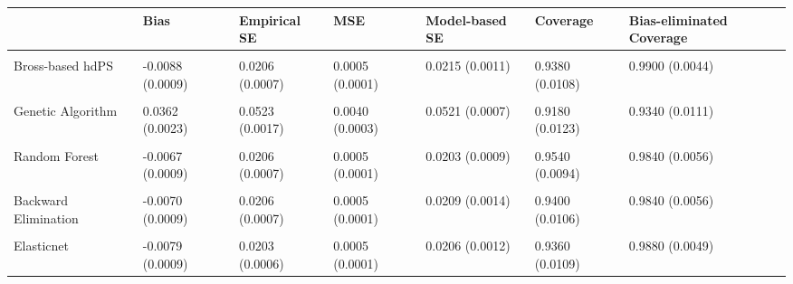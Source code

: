 \begin{table}[!h]
\centering
\begin{tabular}{l|l|l|l|l|l|l}
\hline
  & Bias & Empirical SE & MSE & Model-based SE & Coverage & Bias-eliminated Coverage\\
\hline
\cellcolor{gray!10}{Kitchen sink} & \cellcolor{gray!10}{-0.0093 (0.0009)} & \cellcolor{gray!10}{0.0212 (0.0007)} & \cellcolor{gray!10}{0.0005 (0.0001)} & \cellcolor{gray!10}{0.0219 (0.0009)} & \cellcolor{gray!10}{0.9340 (0.0111)} & \cellcolor{gray!10}{0.9880 (0.0049)}\\
\hline
Bross-based hdPS & -0.0088 (0.0009) & 0.0206 (0.0007) & 0.0005 (0.0001) & 0.0215 (0.0011) & 0.9380 (0.0108) & 0.9900 (0.0044)\\
\hline
\cellcolor{gray!10}{Hybrid hdPS} & \cellcolor{gray!10}{-0.0082 (0.0008)} & \cellcolor{gray!10}{0.0184 (0.0006)} & \cellcolor{gray!10}{0.0004 (0.0000)} & \cellcolor{gray!10}{0.0198 (0.0007)} & \cellcolor{gray!10}{0.9360 (0.0109)} & \cellcolor{gray!10}{0.9880 (0.0049)}\\
\hline
Genetic Algorithm & 0.0362 (0.0023) & 0.0523 (0.0017) & 0.0040 (0.0003) & 0.0521 (0.0007) & 0.9180 (0.0123) & 0.9340 (0.0111)\\
\hline
\cellcolor{gray!10}{XGBoost} & \cellcolor{gray!10}{-0.0061 (0.0007)} & \cellcolor{gray!10}{0.0152 (0.0005)} & \cellcolor{gray!10}{0.0003 (0.0000)} & \cellcolor{gray!10}{0.0179 (0.0003)} & \cellcolor{gray!10}{0.9540 (0.0094)} & \cellcolor{gray!10}{0.9860 (0.0053)}\\
\hline
Random Forest & -0.0067 (0.0009) & 0.0206 (0.0007) & 0.0005 (0.0001) & 0.0203 (0.0009) & 0.9540 (0.0094) & 0.9840 (0.0056)\\
\hline
\cellcolor{gray!10}{Forward Selection} & \cellcolor{gray!10}{-0.0070 (0.0008)} & \cellcolor{gray!10}{0.0187 (0.0006)} & \cellcolor{gray!10}{0.0004 (0.0000)} & \cellcolor{gray!10}{0.0200 (0.0008)} & \cellcolor{gray!10}{0.9520 (0.0096)} & \cellcolor{gray!10}{0.9840 (0.0056)}\\
\hline
Backward Elimination & -0.0070 (0.0009) & 0.0206 (0.0007) & 0.0005 (0.0001) & 0.0209 (0.0014) & 0.9400 (0.0106) & 0.9840 (0.0056)\\
\hline
\cellcolor{gray!10}{LASSO} & \cellcolor{gray!10}{-0.0079 (0.0009)} & \cellcolor{gray!10}{0.0204 (0.0006)} & \cellcolor{gray!10}{0.0005 (0.0001)} & \cellcolor{gray!10}{0.0205 (0.0012)} & \cellcolor{gray!10}{0.9400 (0.0106)} & \cellcolor{gray!10}{0.9880 (0.0049)}\\
\hline
Elasticnet & -0.0079 (0.0009) & 0.0203 (0.0006) & 0.0005 (0.0001) & 0.0206 (0.0012) & 0.9360 (0.0109) & 0.9880 (0.0049)\\
\hline
\end{tabular}
\end{table}
